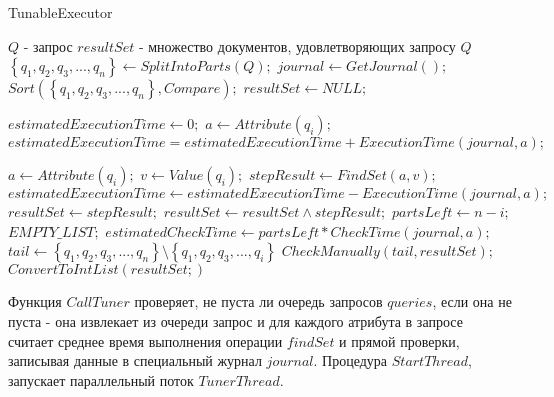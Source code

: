 \documentclass{matmex-diploma}
\begin{document}
        \begin{algorithm}[H]                   
        \caption{TunableExecutor}              
        \label{tunable}                        
            \begin{algorithmic}        
                \REQUIRE $Q$ - запрос
                \ENSURE $resultSet$ - множество документов, удовлетворяющих запросу $Q$
                \STATE $\left\{ q_1, q_2, q_3, ... , q_n \right\} \leftarrow SplitIntoParts(Q);$
                \STATE $journal \leftarrow GetJournal();$
                \STATE $Sort(\left\{ q_1, q_2, q_3, ... , q_n \right\}, Compare);$
                \STATE $resultSet \leftarrow NULL;$
                
                \STATE $estimatedExecutionTime \leftarrow 0;$
                    \STATE $a \leftarrow Attribute(q_i);$
                    \STATE $estimatedExecutionTime = estimatedExecutionTime + ExecutionTime(journal, a);$
                \ENDFOR
                
                    \STATE $a \leftarrow Attribute(q_i);$
                    \STATE $v \leftarrow Value(q_i);$
                    \STATE $stepResult \leftarrow FindSet(a, v);$
                    \STATE $estimatedExecutionTime \leftarrow estimatedExecutionTime - ExecutionTime(journal, a);$
                        \STATE $resultSet \leftarrow stepResult;$
                    \ELSE
                        \STATE $resultSet \leftarrow resultSet \land stepResult;$
                    \ENDIF
                    \STATE $partsLeft \leftarrow n - i;$
                        \RETURN $EMPTY\_LIST;$
                    \ENDIF
                    \STATE $estimatedCheckTime \leftarrow partsLeft * CheckTime(journal, a);$
                        \STATE $tail \leftarrow \left\{ q_1, q_2, q_3, ... , q_n \right\} \setminus \left\{ q_1, q_2, q_3, ... , q_i \right\}$
                        \RETURN $CheckManually(tail, resultSet);$
                    \ENDIF
                \ENDFOR
                \RETURN $ConvertToIntList(resultSet;)$
            \end{algorithmic}
        \end{algorithm}
        
        Функция $CallTuner$ проверяет, не пуста ли очередь запросов $queries$, если она не пуста - она извлекает из очереди запрос и для каждого атрибута в запросе считает среднее время выполнения операции $findSet$ и прямой проверки, записывая данные в специальный журнал $journal$. Процедура $StartThread$, запускает параллельный поток $TunerThread$.
        
\end{document}
